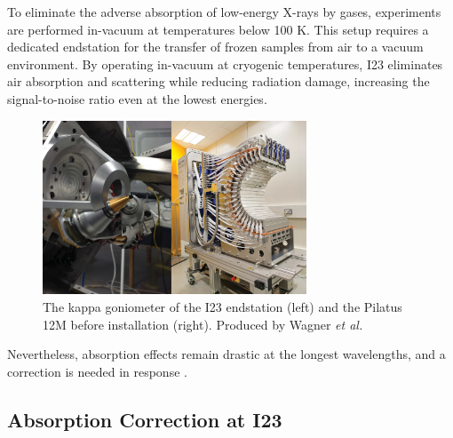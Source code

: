 To eliminate the adverse absorption of low-energy X-rays by gases, experiments are performed in-vacuum at temperatures below 100 K. This setup requires a dedicated endstation for the transfer of frozen samples from air to a vacuum environment. By operating in-vacuum at cryogenic temperatures, I23 eliminates air absorption and scattering while reducing radiation damage, increasing the signal-to-noise ratio even at the lowest energies.

\begin{figure}
    \centering
    \includegraphics[width = 0.7\textwidth]{images/goniometer&detector.PNG}
    \caption{The kappa goniometer of the I23 endstation (left) and the Pilatus 12M before installation (right). Produced by Wagner \textit{et al.} \cite{Wagner2016}}
    \label{fig:gonio_and_detector}
\end{figure}


Nevertheless, absorption effects remain drastic at the longest wavelengths, and a correction is needed in response \cite{Kazantsev2021}.

\subsection{Absorption Correction at I23}



